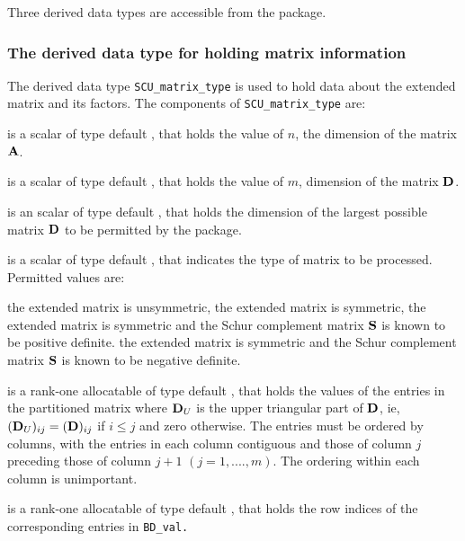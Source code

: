 \documentclass{galahad}
\newcommand{\packagename}{SCU}
\begin{document}

\galtypes
Three derived data types are accessible from the package.


\subsubsection{The derived data type for holding matrix information}
\label{typematrix}
The derived data type {\tt \packagename\_matrix\_type} is used to hold 
data about the extended matrix and its factors. The components of 
{\tt \packagename\_matrix\_type} 
are:

\begin{description}

 is a scalar of type default \integer, that holds the value of 
$n$, the dimension of the matrix $ {\mathbf{A}}$. 
 
 is a scalar of type default \integer, that holds the value of  
$m$, dimension of the matrix ${\mathbf{D}}$. 
 
 is an scalar of type default \integer,
that holds the dimension of the largest possible matrix ${\mathbf{D}}$ to be permitted
by the package. 

 is a scalar of type default \integer,
that indicates the type of matrix to be processed. Permitted values are: 

\begin{description} 
 the extended matrix is unsymmetric, 
 the extended matrix is symmetric, 
 the extended matrix is symmetric and the Schur complement matrix 
${\mathbf{S}}$ is known to be positive definite. 
 the extended matrix is symmetric and the Schur complement matrix 
${\mathbf{S}}$ is known to be negative definite. 
\end{description} 

 is a rank-one allocatable of  
type default \realdp, 
that holds the values of the entries in the partitioned matrix 
where ${\mathbf{D}}_U$ is the upper triangular part of ${\mathbf{D}}$, ie, 
$( {\mathbf{D}}_U )_{ij}  =  ( {\mathbf{D}} )_{ij} $ if $i  \leq  j$ and zero otherwise. 
The entries must be ordered by columns, with the entries in each column 
contiguous and those of column 
$j$ preceding those of column $j+1$ $(j = 1, ...., m)$. The ordering 
within each column is unimportant. 
 
 is a rank-one allocatable of type default \integer, that holds 
the row indices of the corresponding entries in {\tt BD\_val.} 
 

\end{description}
\end{document}

